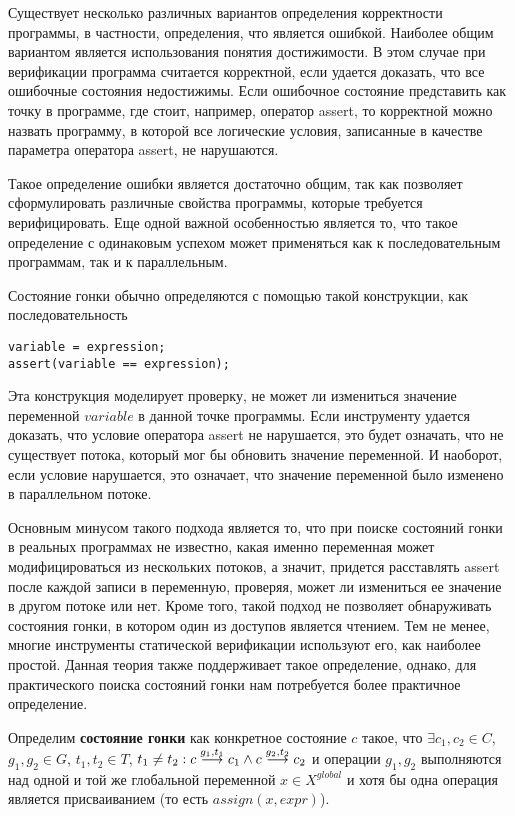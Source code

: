 Существует несколько различных вариантов определения корректности программы, в частности, определения, что является ошибкой.
Наиболее общим вариантом является использования понятия достижимости.
В этом случае при верификации программа считается корректной, если удается доказать, что все ошибочные состояния недостижимы.
Если ошибочное состояние представить как точку в программе, где стоит, например, оператор assert, то корректной можно назвать программу, в которой все логические условия, записанные в качестве параметра оператора assert, не нарушаются.

Такое определение ошибки является достаточно общим, так как позволяет сформулировать различные свойства программы, которые требуется верифицировать. 
Еще одной важной особенностью является то, что такое определение с одинаковым успехом может применяться как к последовательным программам, так и к параллельным. 

Состояние гонки обычно определяются с помощью такой конструкции, как последовательность

\begin{small}
\begin{lstlisting}
variable = expression;
assert(variable == expression);
\end{lstlisting}
\end{small}

Эта конструкция моделирует проверку, не может ли измениться значение переменной $variable$ в данной точке программы.
Если инструменту удается доказать, что условие оператора assert не нарушается, это будет означать, что не существует потока, который мог бы обновить значение переменной.
И наоборот, если условие нарушается, это означает, что значение переменной было изменено в параллельном потоке.

Основным минусом такого подхода является то, что при поиске состояний гонки в реальных программах не известно, какая именно переменная может модифицироваться из нескольких потоков, а значит, придется расставлять assert после каждой записи в переменную, проверяя, может ли измениться ее значение в другом потоке или нет.
Кроме того, такой подход не позволяет обнаруживать состояния гонки, в котором один из доступов является чтением.
Тем не менее, многие инструменты статической верификации используют его, как наиболее простой.
Данная теория также поддерживает такое определение, однако, для практического поиска состояний гонки нам потребуется более практичное определение.

\begin{defn}
\label{raceDef}
Определим \textbf{состояние гонки} как конкретное состояние $c$ такое, что $\exists c_1, c_2 \in C$, $g_1, g_2 \in G$, $t_1, t_2 \in T$, $t_1 \neq t_2 : c \stackrel{g_1, t_1}{\longrightarrow} c_1 \land c \stackrel{g_2, t_2}{\longrightarrow} c_2$ и операции $g_1, g_2$ выполняются над одной и той же глобальной переменной $x \in X^{global}$ и хотя бы одна операция является присваиванием (то есть $assign(x, expr)$).
\end{defn}

